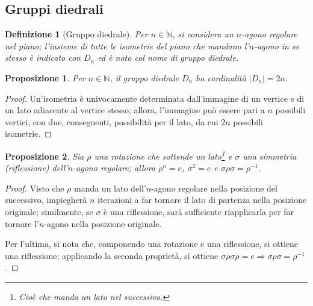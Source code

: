 \documentclass[11pt]{article}
\theoremstyle{style}
\newtheorem{definizione}{Definizione}[section]
\newtheorem{prop}{Proposizione}[section]
\numberwithin{equation}{subsection}
\begin{document}
\subsection{Gruppi diedrali}
\begin{definizione}
	[Gruppo diedrale]
	Per $n \in \mathbb{N}$, si considera un $n$-agono regolare nel piano; l'insieme di tutte le isometrie del piano che mandano l'$n$-agono in se stesso \`e indicato con $D_n$ ed \`e noto col nome di \textit{gruppo diedrale}.
\end{definizione}
\begin{prop}
	Per $n \in \mathbb{N}$, il gruppo diedrale $D_n$ ha cardinalit\`a $\lvert D_n \rvert = 2n$.
\end{prop}
	\begin{proof}
		Un'isometria \`e univocamente determinata dall'immagine di un vertice e di un lato adiacente al vertice stesso; allora, l'immagine pu\`o essere pari a $n$ possibili vertici, con due, conseguenti, possibilit\`a per il lato, da cui $2n$ possibili isometrie.
	\end{proof}
\begin{prop}
	Sia $\rho $ una rotazione che sottende un lato\footnote{Cioè che manda un lato nel successivo.} e $\sigma $ una simmetria (riflessione) dell'$n$-agono regolare; allora $\rho ^n = e$, $\sigma ^2 =e$ e $\sigma \rho \sigma = \rho ^{-1} $.
\end{prop}
	\begin{proof}
		Visto che $\rho $ manda un lato dell'$n$-agono regolare nella posizione del successivo, impiegher\`a $n$ iterazioni a far tornare il lato di partenza nella posizione originale; similmente, se $\sigma $ \`e una riflessione, sar\`a sufficiente riapplicarla per far tornare l'$n$-agono nella posizione originale.

		Per l'ultima, si nota che, componendo una rotazione e una riflessione, si ottiene una riflessione; applicando la seconda propriet\`a, si ottiene $\sigma \rho \sigma \rho = e \Rightarrow \sigma \rho \sigma  = \rho ^{-1} $.
	\end{proof}
\end{document}
